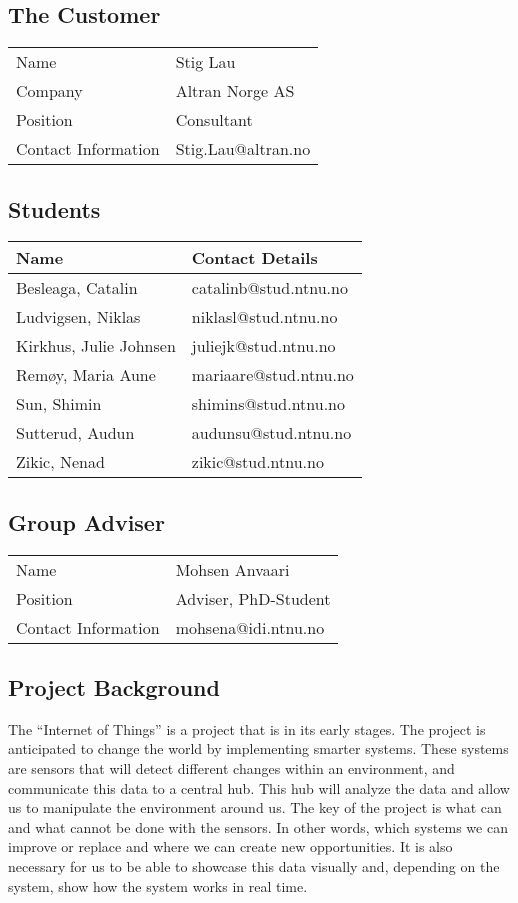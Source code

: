 ﻿\documentclass[../document.tex]{subfiles}
\begin{document}
\subsection*{The Customer}
\begin{tabular}{ll}
\hline
Name					&	Stig Lau\\
Company				&	Altran Norge AS\\
Position				&	Consultant\\
Contact Information		&	Stig.Lau@altran.no\\
\hline
\end{tabular}

\subsection*{Students}
\begin{tabular}{ll}
\hline
Name				&	Contact Details\\ \hline
Besleaga, Catalin		&	catalinb@stud.ntnu.no\\
Ludvigsen, Niklas		&	niklasl@stud.ntnu.no\\
Kirkhus, Julie Johnsen	&	juliejk@stud.ntnu.no\\
Remøy, Maria Aune		&	mariaare@stud.ntnu.no\\
Sun, Shimin			&	shimins@stud.ntnu.no\\
Sutterud, Audun		&	audunsu@stud.ntnu.no\\
Zikic, Nenad			&	zikic@stud.ntnu.no\\
\hline
\end{tabular}

\subsection*{Group Adviser}
\begin{tabular}{ll}
\hline
Name				&	Mohsen Anvaari\\
Position			&	Adviser, PhD-Student\\
Contact Information	&	mohsena@idi.ntnu.no\\
\hline
\end{tabular}

\subsection*{Project Background}
The “Internet of Things” is a project that is in its early stages. The project is anticipated to change the world by implementing smarter systems. These systems are sensors that will detect different changes within an environment, and communicate this data to a central hub. This hub will analyze the data and allow us to manipulate the environment around us. The key of the project is what can and what cannot be done with the sensors. In other words, which systems we can improve or replace and where we can create new opportunities. It is also necessary for us to be able to showcase this data visually and, depending on the system, show how the system works in real time.
\end{document}
